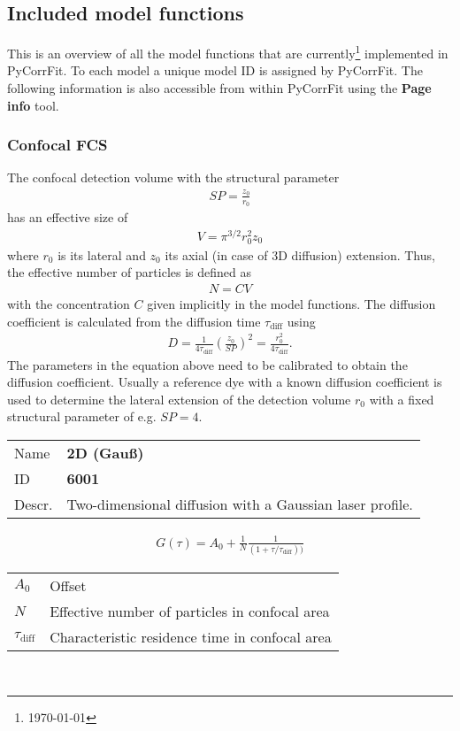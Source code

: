 \subsection{Included model functions}
This is an overview of all the model functions that are currently\footnote{\today} implemented in PyCorrFit. To each model a unique model ID is assigned by PyCorrFit. The following information is also accessible from within PyCorrFit using the \textbf{Page info} tool.

\subsubsection{Confocal FCS}
The confocal detection volume with the structural parameter 
\begin{align}
\mathit{SP}= \frac{z_0}{r_0}
\end{align}
has an effective size of
\begin{align}
V = \pi^{3/2} r_0^2 z_0
\end{align}
where $r_0$ is its lateral and $z_0$ its axial (in case of 3D diffusion) extension. Thus, the effective number of particles is defined as
\begin{align}
N = C V
\end{align}
with the concentration $C$ given implicitly in the model functions.
The diffusion coefficient is calculated from the diffusion time $\tau_\mathrm{diff}$ using
\begin{align}
D = \frac{1}{4 \tau_\mathrm{diff}} \left( \frac{z_0}{\mathit{SP}} \right)^2 = \frac{r_0^2}{4 \tau_\mathrm{diff}}.
\end{align}
The parameters in the equation above need to be calibrated to obtain the diffusion coefficient. Usually a reference dye with a known diffusion coefficient is used to determine the lateral extension of the detection volume $r_0$ with a fixed structural parameter of e.g. $\mathit{SP}=4$.\\
\vspace{2em}


\noindent \begin{tabular}{lp{}}
Name & \textbf{2D (Gauß)} \\ 
ID & \textbf{6001} \\ 
Descr. &  Two-dimensional diffusion with a Gaussian laser profile. \\ 
\end{tabular}
\begin{align}
G(\tau) = A_0 + \frac{1}{N} \frac{1}{(1+\tau/\tau_\mathrm{diff}) )}
\end{align} 
\begin{center}
\begin{tabular}{ll}
$A_0$ & Offset \\ 
$N$ & Effective number of particles in confocal area \\ 
$\tau_\mathrm{diff}$ &   Characteristic residence time in confocal area \\
\end{tabular} \\
\end{center}
\vspace{2em}


